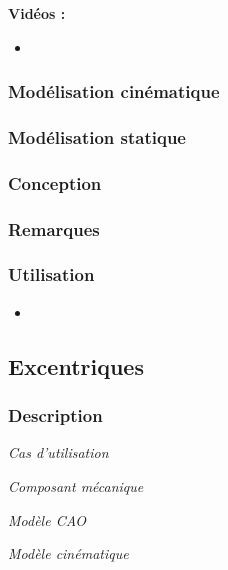 \documentclass[11pt,oneside]{article}
\begin{document}
\textbf{Vidéos :}
\begin{itemize}
\item
\end{itemize}

\subsubsection{Modélisation cinématique}
\subsubsection{Modélisation statique}
\subsubsection{Conception}
\subsubsection{Remarques}
\subsubsection{Utilisation}
\begin{itemize}
\item
\end{itemize}
\newpage

\subsection{Excentriques}
\subsubsection{Description}

\begin{center}
\hfill
\begin{minipage}[c]{.21\linewidth}
\begin{center}
\textit{Cas d'utilisation}
\end{center}
\end{minipage} \hfill
\begin{minipage}[c]{.21\linewidth}
\begin{center}
\textit{Composant mécanique}
\end{center}
\end{minipage} \hfill
\begin{minipage}[c]{.21\linewidth}
\begin{center}
\textit{Modèle CAO}
\end{center} 
\end{minipage}\hfill
\begin{minipage}[c]{.21\linewidth}
\begin{center}
\textit{Modèle cinématique}
\end{center} 
\end{minipage}\hfill
\end{center}
\end{document}
